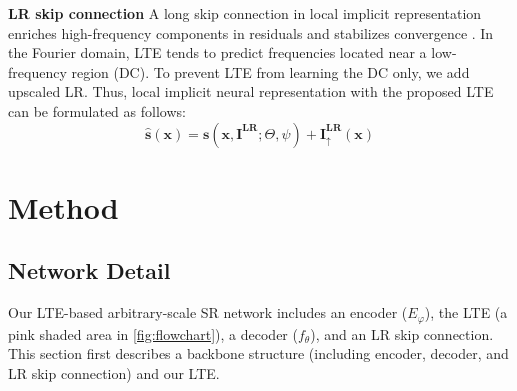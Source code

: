 \documentclass[10pt,twocolumn,letterpaper]{article}
\begin{document}
{\bf LR skip connection} A long skip connection in local implicit representation enriches high-frequency components in residuals and stabilizes convergence \cite{Kim_2016_CVPR}. In the Fourier domain, LTE tends to predict frequencies located near a low-frequency region (DC). To prevent LTE from learning the DC only, we add upscaled LR. Thus, local implicit neural representation with the proposed LTE can be formulated as follows:
\begin{equation}
\hat{\mathbf s}(\mathbf{x})=\mathbf s(\mathbf{x},\mathbf{I^{LR}};\Theta,\psi)+\mathbf I^{\mathbf{LR}}_{\uparrow}(\mathbf{x})
\label{eq:eight}
\end{equation} 

























































\section{Method}
\subsection{Network Detail}
Our LTE-based arbitrary-scale SR network includes an encoder ($E_\varphi$), the LTE (a pink shaded area in \cref{fig:flowchart}), a decoder ($f_\theta$), and an LR skip connection. This section first describes a backbone structure (including encoder, decoder, and LR skip connection) and our LTE.
\end{document}
